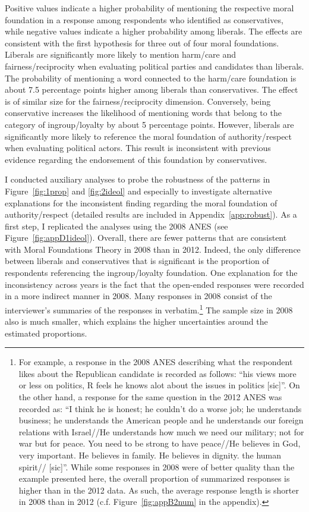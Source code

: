 \documentclass[12pt]{article}
\begin{document}
Positive values indicate a higher probability of mentioning the respective moral foundation in a response among respondents who identified as conservatives, while negative values indicate a higher probability among liberals. The effects are consistent with the first hypothesis for three out of four moral foundations. Liberals are significantly more likely to mention harm/care and fairness/reciprocity when evaluating political parties and candidates than liberals. The probability of mentioning a word connected to the harm/care foundation is about 7.5 percentage points higher among liberals than conservatives. The effect is of similar size for the fairness/reciprocity dimension. Conversely, being conservative increases the likelihood of mentioning words that belong to the category of ingroup/loyalty by about 5 percentage points. However, liberals are significantly more likely to reference the moral foundation of authority/respect when evaluating political actors. This result is inconsistent with previous evidence regarding the endorsement of this foundation by conservatives. 

I conducted auxiliary analyses to probe the robustness of the patterns in Figure~\ref{fig:1prop} and \ref{fig:2ideol} and especially to investigate alternative explanations for the inconsistent finding regarding the moral foundation of authority/respect (detailed results are included in Appendix~\ref{app:robust}). As a first step, I replicated the analyses using the 2008 ANES (see Figure~\ref{fig:appD1ideol}). Overall, there are fewer patterns that are consistent with Moral Foundations Theory in 2008 than in 2012. Indeed, the only difference between liberals and conservatives that is significant is the proportion of respondents referencing the ingroup/loyalty foundation. One explanation for the inconsistency across years is the fact that the open-ended responses were recorded in a more indirect manner in 2008. Many responses in 2008 consist of the interviewer's summaries of the responses in verbatim.\footnote{For example, a response in the 2008 ANES describing what the respondent likes about the Republican candidate is recorded as follows: ``his views more or less on politics, R feels he knows alot about the issues in politics
[sic]''. On the other hand, a response for the same question in the 2012 ANES was recorded as: ``I think he is honest; he couldn't do a worse job; he understands business; he understands the American people and he understands our foreign relations with Israel//He understands how much we need our military; not for war but for peace. You need to be strong to have peace//He believes in God, very important. He believes in family. He believes in dignity. the human spirit// [sic]''. While some responses in 2008 were of better quality than the example presented here, the overall proportion of summarized responses is higher than in the 2012 data. As such, the average response length is shorter in 2008 than in 2012 (c.f. Figure~\ref{fig:appB2num} in the appendix).} The sample size in 2008 also is much smaller, which explains the higher uncertainties around the estimated proportions.
\end{document}

